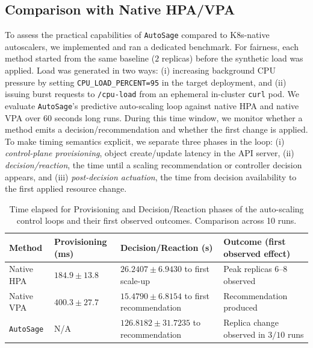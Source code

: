 \documentclass[sigconf]{acmart}
\newcommand{\Solution}{\texttt{AutoSage}}
\begin{document}
\subsection{Comparison with Native HPA/VPA}

To assess the practical capabilities of \Solution{} compared to K8s-native autoscalers, we implemented and ran a dedicated benchmark.
For fairness, each method started from the same baseline (\(2\) replicas) before the synthetic load was applied.
%
Load was generated in two ways: (i) increasing background CPU pressure by setting \texttt{CPU\_LOAD\_PERCENT=95} in the target deployment, and (ii) issuing burst requests to \texttt{/cpu-load} from an ephemeral in-cluster \texttt{curl} pod. We evaluate \Solution{}'s predictive auto-scaling loop against native HPA and native VPA over \(60\) seconds long runs. During this time window, we monitor whether a method emits a decision/recommendation and whether the first change is applied. To make timing semantics explicit, we separate three phases in the loop: (i) \emph{control-plane provisioning}, object create/update latency in the API server, (ii) \emph{decision/reaction}, the time until a scaling recommendation or controller decision appears, and (iii) \emph{post-decision actuation}, the time from decision availability to the first applied resource change.

\begin{table}[t]
  \centering
  \caption{Time elapsed for Provisioning and Decision/Reaction phases of the auto-scaling control loops and their first observed outcomes. Comparison across 10 runs.}
  \label{tab:native-compare}
  \footnotesize
  \setlength{\tabcolsep}{3pt}
  \renewcommand{\arraystretch}{1.1}
  \begin{tabular}{>{\raggedright\arraybackslash}p{1.2cm}
                  >{\raggedright\arraybackslash}p{1.45cm}
                  >{\raggedright\arraybackslash}p{2.15cm}
                  >{\raggedright\arraybackslash}p{2.55cm}}
    \toprule
    Method & Provisioning (ms) & Decision/Reaction (s) & Outcome (first observed effect) \\

    \midrule
    Native HPA & \(184.9 \pm 13.8\) & \(26.2407 \pm 6.9430\) to first scale-up & Peak replicas \(6\)--\(8\) observed \\
    Native VPA & \(400.3 \pm 27.7\) & \(15.4790 \pm 6.8154\) to first recommendation & Recommendation produced \\
    \Solution{} & N/A & \(126.8182 \pm 31.7235\) to recommendation & Replica change observed in \(3/10\) runs \\
    \bottomrule
  \end{tabular}
\end{table}
\end{document}
